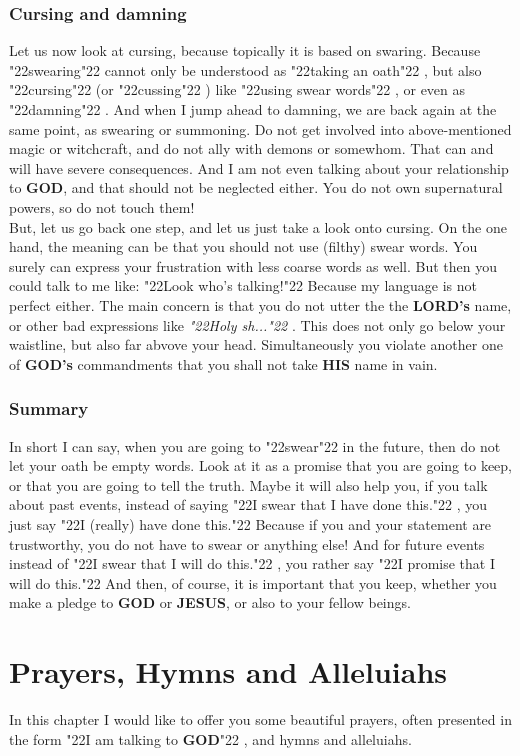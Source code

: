 \documentclass[10pt,a5paper]{article}
\newcommand{\God}[0]{\textbf{GOD}}
\newcommand{\Gods}[0]{\textbf{GOD's}}
\newcommand{\His}[0]{\textbf{HIS}}
\newcommand{\Jesus}[0]{\textbf{JESUS}}
\newcommand{\Lords}[0]{\textbf{LORD's}}
\newcommand{\q}[1]{\char"22{#1}\char"22 }
\begin{document}
	\subsubsection{Cursing and damning}
		Let us now look at cursing,
		because topically it is based on swaring.
		Because \q{swearing} cannot only be understood as \q{taking an oath},
		but also \q{cursing} (or \q{cussing})
		like \q{using swear words},
		or even as \q{damning}.
		And when I jump ahead to damning,
		we are back again at the same point,
		as swearing or summoning.
		Do not get involved into above-mentioned magic or witchcraft,
		and do not ally with demons or somewhom.
		That can and will have severe consequences.
		And I am not even talking about your relationship to {\God},
		and that should not be neglected either.
		You do not own supernatural powers,
		so do not touch them!
		\\
		But,
		let us go back one step,
		and let us just take a look onto cursing.
		On the one hand,
		the meaning can be that you should not use (filthy) swear words.
		You surely can express your frustration with less coarse words as well.
		But then you could talk to me like:
		\q{Look who's talking!}
		Because my language is not perfect either.
		The main concern is that you do not utter the the {\Lords} name,
		or other bad expressions like \textit{\q{Holy sh...}}.
		This does not only go below your waistline,
		but also far abvove your head.
		Simultaneously you violate another one of {\Gods} commandments that you shall not take {\His} name in vain.

	\subsubsection{Summary}
		In short I can say,
		when you are going to \q{swear} in the future,
		then do not let your oath be empty words.
		Look at it as a promise that you are going to keep,
		or that you are going to tell the truth.
		Maybe it will also help you,
		if you talk about past events,
		instead of saying \q{I swear that I have done this.},
		you just say \q{I (really) have done this.}
		Because if you and your statement are trustworthy,
		you do not have to swear or anything else!
		And for future events instead of \q{I swear that I will do this.},
		you rather say \q{I promise that I will do this.}
		And then,
		of course,
		it is important that you keep,
		whether you make a pledge to {\God} or {\Jesus},
		or also to your fellow beings.

	\newpage
	\section{Prayers, Hymns and Alleluiahs}
		In this chapter I would like to offer you some beautiful prayers,
		often presented in the form \q{I am talking to {\God}},
		and hymns and alleluiahs.
\end{document}
